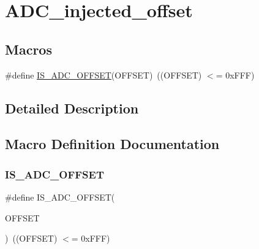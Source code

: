 \hypertarget{group___a_d_c__injected__offset}{}\section{A\+D\+C\+\_\+injected\+\_\+offset}
\label{group___a_d_c__injected__offset}
\subsection*{Macros}
\begin{DoxyCompactItemize}
\item 
\#define \mbox{\hyperlink{group___a_d_c__injected__offset_ga252eaf5d2552f0d11b1bcca7dc48950a}{I\+S\+\_\+\+A\+D\+C\+\_\+\+O\+F\+F\+S\+ET}}(O\+F\+F\+S\+ET)~((O\+F\+F\+S\+ET) $<$= 0x\+F\+F\+F)
\end{DoxyCompactItemize}


\subsection{Detailed Description}


\subsection{Macro Definition Documentation}
\mbox{\label{group___a_d_c__injected__offset_ga252eaf5d2552f0d11b1bcca7dc48950a}} 
\subsubsection{\texorpdfstring{IS\_ADC\_OFFSET}{IS\_ADC\_OFFSET}}
{\footnotesize\ttfamily \#define I\+S\+\_\+\+A\+D\+C\+\_\+\+O\+F\+F\+S\+ET(\begin{DoxyParamCaption}\item[{}]{O\+F\+F\+S\+ET }\end{DoxyParamCaption})~((O\+F\+F\+S\+ET) $<$= 0x\+F\+F\+F)}

